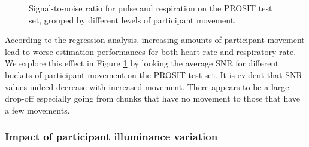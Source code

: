 \documentclass{article}
\begin{document}
\begin{figure}[h!]
  \centering
  \caption{Signal-to-noise ratio for pulse and respiration on the PROSIT test set, grouped by different levels of participant movement.}
  \label{fig:impact-movement}
\end{figure}

According to the regression analysis, increasing amounts of participant movement lead to worse estimation performances for both heart rate and respiratory rate.
We explore this effect in Figure \ref{fig:impact-movement} by looking the average SNR for different buckets of participant movement on the PROSIT test set.
It is evident that SNR values indeed decrease with increased movement.
There appears to be a large drop-off especially going from chunks that have no movement to those that have a few movements.

\subsubsection{Impact of participant illuminance variation}

\datatable
\end{document}

